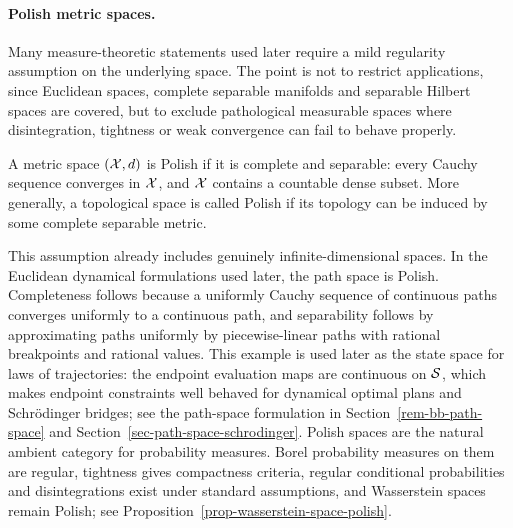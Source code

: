 \paragraph{Polish metric spaces.}
Many measure-theoretic statements used later require a mild regularity assumption on the underlying space. The point is not to restrict applications, since Euclidean spaces, complete separable manifolds and separable Hilbert spaces are covered, but to exclude pathological measurable spaces where disintegration, tightness or weak convergence can fail to behave properly.

\begin{defn}\label{def-polish-metric-space}
	A metric space $(\mathcal{X},d)$ is Polish if it is complete and separable: every Cauchy sequence converges in $\mathcal{X}$, and $\mathcal{X}$ contains a countable dense subset. More generally, a topological space is called Polish if its topology can be induced by some complete separable metric.
\end{defn}
This assumption already includes genuinely infinite-dimensional spaces. In the Euclidean dynamical formulations used later, the path space
is Polish. Completeness follows because a uniformly Cauchy sequence of continuous paths converges uniformly to a continuous path, and separability follows by approximating paths uniformly by piecewise-linear paths with rational breakpoints and rational values. This example is used later as the state space for laws of trajectories: the endpoint evaluation maps are continuous on $\mathcal{S}$, which makes endpoint constraints well behaved for dynamical optimal plans and Schr\"odinger bridges; see the path-space formulation in Section~\ref{rem-bb-path-space} and Section~\ref{sec-path-space-schrodinger}.
Polish spaces are the natural ambient category for probability measures. Borel probability measures on them are regular, tightness gives compactness criteria, regular conditional probabilities and disintegrations exist under standard assumptions, and Wasserstein spaces remain Polish; see Proposition~\ref{prop-wasserstein-space-polish}.

